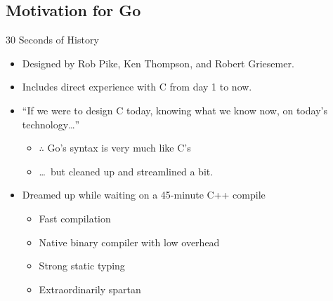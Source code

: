 \documentclass[pdf]{beamer}
\begin{document}
\subsection{Motivation for Go}
\begin{frame}{30 Seconds of History}
	\begin{itemize}
		\item Designed by Rob Pike, Ken Thompson, and Robert Griesemer.
		\item Includes direct experience with C from day 1 to now.
			\pause
		\item ``If we were to design C today, knowing what we know now, on today's technology\dots''
			\pause
			\begin{itemize}
		\item $\therefore$ Go's syntax is very much like C's
		\item \dots\ but cleaned up and streamlined a bit.
			\end{itemize}
		\pause
		\item Dreamed up while waiting on a 45-minute C++ compile
		\pause
			\begin{itemize}
				\item Fast compilation
				\item Native binary compiler with low overhead
				\item Strong static typing
				\item Extraordinarily spartan
			\end{itemize}
	\end{itemize}
\end{frame}
\end{document}
